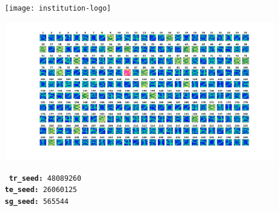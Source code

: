 
\thispagestyle{empty}
\clearpage
\setcounter{page}{-1}

\makeatletter
\begin{titlepage}
{
    \centering
    \texttt{[image: institution-logo]}
    \null%
    \vspace{2em}
    {\Huge \bfseries \@title \par}
    \vspace{3em}
    {\large \scshape \@date \par}
    \vspace{2em}
    \begin{center}
    \includegraphics[width=0.9\textwidth]{../src/SGM_te_plot.png}
    \end{center}
    \vfill
\begin{center}
\end{center}
    \vspace{1em}

    \vfill
    {{\raggedleft \large \@author \par}
    \vspace{2em}
    {\raggedleft \large \tt
        \textbf{tr\_seed:} 48089260 \\
        \textbf{te\_seed:} 26060125 \\
        \textbf{sg\_seed:} \hphantom{00}565544 \\
\par}}
}
\end{titlepage}
\makeatother
